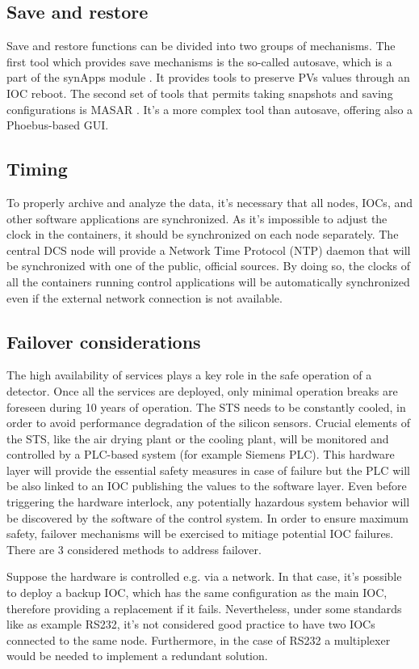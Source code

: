 \subsection{Save and restore}
Save and restore functions can be divided into two groups of mechanisms. The first tool which provides save mechanisms is the so-called autosave, which is a part of the synApps module \cite{autosave}. It provides tools to preserve PVs values through an IOC reboot. The second set of tools that permits taking snapshots and saving configurations is MASAR \cite{masar}. It's a more complex tool than autosave, offering also a Phoebus-based \gls{GUI}. 
\subsection{Timing}
To properly archive and analyze the data, it's necessary that all nodes, \glspl{IOC}, and other software applications are synchronized. As it's impossible to adjust the clock in the containers, it should be synchronized on each node separately. The central \gls{DCS} node will provide a Network Time Protocol (\gls{NTP}) daemon that will be synchronized with one of the public, official sources.  By doing so, the clocks of all the containers running control applications will be automatically synchronized even if the external network connection is not available. 
\subsection{Failover considerations}
The high availability of services plays a key role in the safe operation of a detector. Once all the services are deployed, only minimal operation breaks are foreseen during 10 years of operation. The STS needs to be constantly cooled, in order to avoid performance degradation of the silicon sensors.
Crucial elements of the STS, like the air drying plant or the cooling plant, will be monitored and controlled by a PLC-based system (for example Siemens PLC). This hardware layer will provide the essential safety measures in case of failure but the PLC will be also linked to an IOC publishing the values to the software layer. Even before triggering the hardware interlock, any potentially hazardous system behavior will be discovered by the software of the control system. In order to ensure maximum safety, failover mechanisms will be exercised to mitiage potential IOC failures. There are 3 considered methods to address failover. 


Suppose the hardware is controlled e.g. via a network. In that case, it's possible to deploy a backup IOC, which has the same configuration as the main IOC, therefore providing a replacement if it fails. Nevertheless, under some standards like as example RS232, it's not considered good practice to have two IOCs connected to the same node. Furthermore, in the case of RS232 a multiplexer would be needed to implement a redundant solution. 

